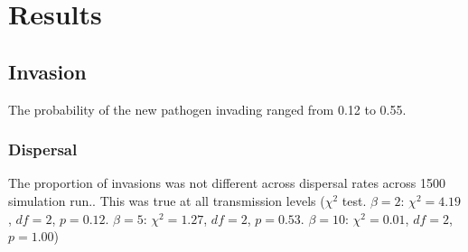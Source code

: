 
\clearpage
\section{Results}


\subsection{Invasion}
The probability of the new pathogen invading ranged from 0.12 to 0.55.


\subsubsection{Dispersal}


The proportion of invasions was not different across dispersal rates across 1500 simulation run.. 
This was true at all transmission levels ($\chi^2$ test. $\beta = 2$: $\chi^2 = 4.19$, $df = 2$, $p = 0.12$. $\beta = 5$: $\chi^2 = 1.27$, $df = 2$, $p = 0.53$. $\beta = 10$: $\chi^2 = 0.01$, $df = 2$, $p = 1.00$)


